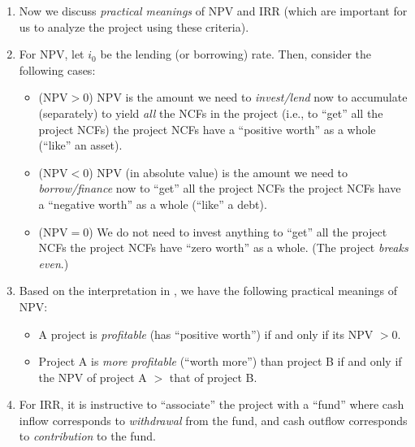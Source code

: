 \begin{enumerate}
\item Now we discuss \emph{practical meanings} of NPV and IRR (which are
important for us to analyze the project using these criteria).

\item \label{it:interpret-npv}
For NPV, let \(i_0\) be the lending (or borrowing) rate.  Then, consider the
following cases:
\begin{itemize}
\item (\(\text{NPV}>0\)) NPV is the amount we need to \emph{invest/lend} now to
accumulate (separately) to yield \emph{all} the NCFs in the project (i.e., to
``get'' all the project NCFs)  the project NCFs have a
``positive worth'' as a whole (``like'' an asset).
\item (\(\text{NPV}<0\)) NPV (in absolute value) is the amount we need to
\emph{borrow/finance} now to ``get'' all the project NCFs 
the project NCFs have a ``negative worth'' as a whole (``like'' a debt).
\item (\(\text{NPV}=0\)) We do not need to invest anything to ``get'' all the
project NCFs  the project NCFs have ``zero worth'' as a
whole. (The project \emph{breaks even}.)
\end{itemize}
\item \label{it:npv-pract-meanings}
Based on the interpretation in , we have the
following practical meanings of NPV:
\begin{itemize}
\item A project is \emph{profitable} (has ``positive worth'') if and only if
its NPV \(>0\).
\item Project A is \emph{more profitable} (``worth more'') than project B if
and only if the NPV of project A \(>\) that of project B.
\end{itemize}
\item For IRR, it is instructive to ``associate'' the project with a ``fund''
 where cash inflow corresponds to \emph{withdrawal}
 from the fund, and cash outflow corresponds to
\emph{contribution}  to the fund.


\end{enumerate}
